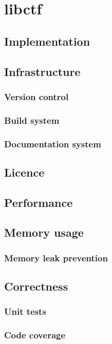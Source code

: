 \chapter{libctf}

\section{Implementation}
\section{Infrastructure}
\subsection{Version control}
\subsection{Build system}
\subsection{Documentation system}
\section{Licence}
\section{Performance}
\section{Memory usage}
\subsection{Memory leak prevention}
\section{Correctness}
\subsection{Unit tests}
\subsection{Code coverage}


